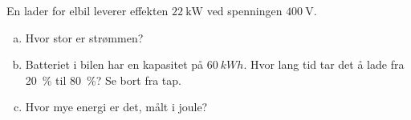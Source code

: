 %
En lader for elbil leverer effekten $\SI{22}{\kilo\watt}$ ved spenningen $\SI{400}{\volt}$.
\begin{enumerate}[a)]
    \item Hvor stor er strømmen?
    \item Batteriet i bilen har en kapasitet på $\SI{60}{kWh}$. Hvor lang tid tar det å lade fra \SI{20}{\percent} til \SI{80}{\percent}? Se bort fra tap.
    \item Hvor mye energi er det, målt i joule?
\end{enumerate}
%
